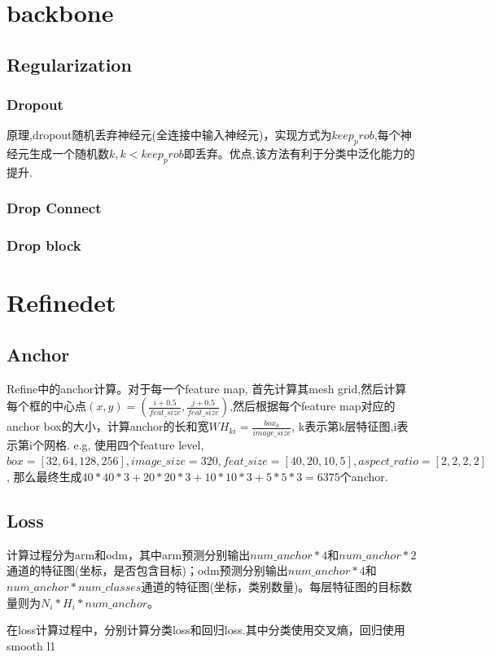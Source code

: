 \documentclass{article}
\begin{document}
\section{backbone}
\subsection{Regularization}
\subsubsection{Dropout}
原理,dropout随机丢弃神经元(全连接中输入神经元)，实现方式为$keep_prob$,每个神经元生成一个随机数$k,k<keep_prob$即丢弃。优点,该方法有利于分类中泛化能力的提升.
\subsubsection{Drop Connect}
\subsubsection{Drop block}


\section{Refinedet}
\subsection{Anchor}
Refine中的anchor计算。对于每一个feature map, 首先计算其mesh grid,然后计算每个框的中心点$(x,y)=(\frac{i+0.5}{feat\_size},\frac{j+0.5}{feat\_size})$,然后根据每个feature map对应的anchor box的大小，计算anchor的长和宽$WH_{ki}=\frac{box_k}{image\_size}$, k表示第k层特征图,i表示第i个网格. e.g, 使用四个feature level, $box=[32,64,128,256], image\_size=320, feat\_size=[40,20,10,5], aspect\_ ratio=[2,2,2,2]$, 那么最终生成$40*40*3+20*20*3+10*10*3+5*5*3=6375$个anchor.

\subsection{Loss}
计算过程分为arm和odm，其中arm预测分别输出$num\_anchor*4$和$num\_anchor*2$通道的特征图(坐标，是否包含目标)；odm预测分别输出$num\_anchor*4$和$num\_anchor*num\_classes$通道的特征图(坐标，类别数量)。每层特征图的目标数量则为$N_i*H_i*num\_anchor$。

在loss计算过程中，分别计算分类loss和回归loss.其中分类使用交叉熵，回归使用smooth l1
\end{document}
